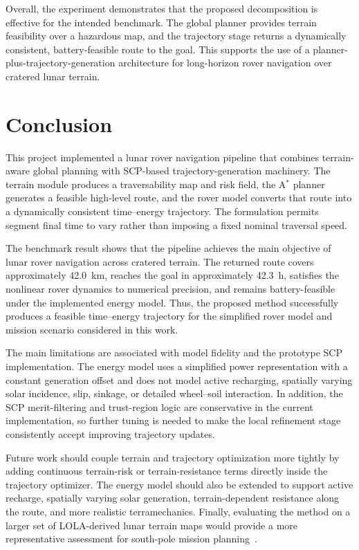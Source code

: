Overall, the experiment demonstrates that the proposed decomposition is effective for the intended benchmark. The global planner provides terrain feasibility over a hazardous map, and the trajectory stage returns a dynamically consistent, battery-feasible route to the goal. This supports the use of a planner-plus-trajectory-generation architecture for long-horizon rover navigation over cratered lunar terrain.

\section{Conclusion}
This project implemented a lunar rover navigation pipeline that combines terrain-aware global planning with SCP-based trajectory-generation machinery. The terrain module produces a traversability map and risk field, the A$^\ast$ planner generates a feasible high-level route, and the rover model converts that route into a dynamically consistent time--energy trajectory. The formulation permits segment final time to vary rather than imposing a fixed nominal traversal speed.

The benchmark result shows that the pipeline achieves the main objective of lunar rover navigation across cratered terrain. The returned route covers approximately \SI{42.0}{km}, reaches the goal in approximately \SI{42.3}{h}, satisfies the nonlinear rover dynamics to numerical precision, and remains battery-feasible under the implemented energy model. Thus, the proposed method successfully produces a feasible time--energy trajectory for the simplified rover model and mission scenario considered in this work.

The main limitations are associated with model fidelity and the prototype SCP implementation. The energy model uses a simplified power representation with a constant generation offset and does not model active recharging, spatially varying solar incidence, slip, sinkage, or detailed wheel--soil interaction. In addition, the SCP merit-filtering and trust-region logic are conservative in the current implementation, so further tuning is needed to make the local refinement stage consistently accept improving trajectory updates.

Future work should couple terrain and trajectory optimization more tightly by adding continuous terrain-risk or terrain-resistance terms directly inside the trajectory optimizer. The energy model should also be extended to support active recharge, spatially varying solar generation, terrain-dependent resistance along the route, and more realistic terramechanics. Finally, evaluating the method on a larger set of LOLA-derived lunar terrain maps would provide a more representative assessment for south-pole mission planning~\cite{nasa_lola,moon_sokolov}.
